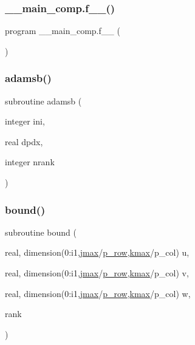 \subsubsection{\texorpdfstring{\+\_\+\+\_\+main\+\_\+comp.\+f\+\_\+\+\_\+()}{\_\_main\_comp.f\_\_()}}
{\footnotesize\ttfamily program \+\_\+\+\_\+main\+\_\+comp.\+f\+\_\+\+\_\+ (\begin{DoxyParamCaption}{ }\end{DoxyParamCaption})}

\mbox{\label{main__comp_8f_a8274773c9ed27c825e804bad6efeefd9}} 
\subsubsection{\texorpdfstring{adamsb()}{adamsb()}}
{\footnotesize\ttfamily subroutine adamsb (\begin{DoxyParamCaption}\item[{integer}]{ini,  }\item[{real}]{dpdx,  }\item[{integer}]{nrank }\end{DoxyParamCaption})}

\mbox{\label{main__comp_8f_a36c2d4d009a7600ece94a238769849ac}} 
\subsubsection{\texorpdfstring{bound()}{bound()}}
{\footnotesize\ttfamily subroutine bound (\begin{DoxyParamCaption}\item[{real, dimension(0\+:i1,\hyperlink{param_8h_ac5c80d846ec0c4cf1c91fc5d9d66faa1}{jmax}/\hyperlink{param_8h_a149afb59990224def797b29467985bac}{p\+\_\+row},\hyperlink{param_8h_ae0453dd20a7c6a923904df942ef82468}{kmax}/p\+\_\+col)}]{u,  }\item[{real, dimension(0\+:i1,\hyperlink{param_8h_ac5c80d846ec0c4cf1c91fc5d9d66faa1}{jmax}/\hyperlink{param_8h_a149afb59990224def797b29467985bac}{p\+\_\+row},\hyperlink{param_8h_ae0453dd20a7c6a923904df942ef82468}{kmax}/p\+\_\+col)}]{v,  }\item[{real, dimension(0\+:i1,\hyperlink{param_8h_ac5c80d846ec0c4cf1c91fc5d9d66faa1}{jmax}/\hyperlink{param_8h_a149afb59990224def797b29467985bac}{p\+\_\+row},\hyperlink{param_8h_ae0453dd20a7c6a923904df942ef82468}{kmax}/p\+\_\+col)}]{w,  }\item[{}]{rank }\end{DoxyParamCaption})}

